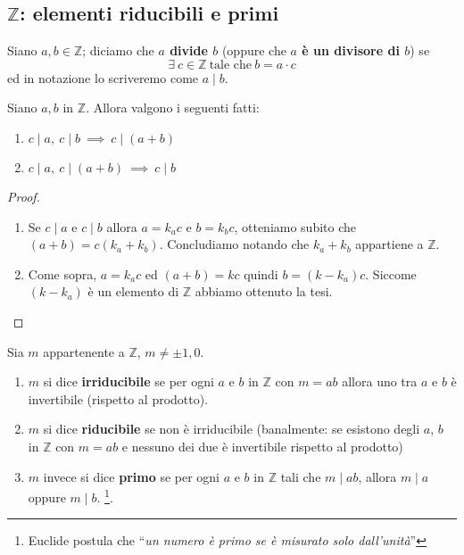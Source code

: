 \subsection{$\mathbb{Z}$: elementi riducibili e primi}
\begin{definizione}[Divisore] Siano $a,b \in \mathbb{Z}$; diciamo che \textbf{$a$ divide $b$} (oppure che \textbf{$a$ è un divisore di $b$}) se 
	\begin{equation*}
	\exists \ c \in \mathbb{Z} \ \text{tale che} \ b = a \cdot c
	\end{equation*}
	ed in notazione lo scriveremo come $a \mid  b$.
\end{definizione}
\begin{proposizione}
	Siano $a,b$ in $\mathbb{Z}$. Allora valgono i seguenti fatti:
	\begin{enumerate}
		\item $c\mid a, \ c\mid b \ \implies \ c\mid (a+b)$
		\item $c\mid a, \ c\mid (a+b) \ \implies \ c\mid b$
	\end{enumerate}
\end{proposizione}
\begin{proof}\ 
\begin{enumerate}
	\item Se $c\mid a$ e $c\mid b$ allora $a=k_a c$ e $b = k_b c$, otteniamo subito che $(a+b)=c(k_a+k_b)$. Concludiamo notando che $k_a+k_b$ appartiene a $\mathbb{Z}$.
	\item Come sopra, $a=k_ac$ ed $(a+b)=kc$ quindi $b=(k-k_a)c$. Siccome $(k-k_a)$ è un elemento di $\mathbb{Z}$ abbiamo ottenuto la tesi.
\end{enumerate}
\end{proof}
\begin{definizione}
	Sia $m$ appartenente a $\mathbb{Z}$, $m \neq \pm 1, 0$.
	\begin{enumerate}
		\item $m$ si dice \textbf{irriducibile} se per ogni $a$ e $b$ in $\mathbb{Z}$ con $m=ab$ allora uno tra $a$ e $b$ è invertibile (rispetto al prodotto).
		\item $m$ si dice \textbf{riducibile} se non è irriducibile (banalmente: se esistono degli $a$, $b$ in $\mathbb{Z}$ con $m=ab$ e nessuno dei due è invertibile rispetto al prodotto)
		\item $m$ invece si dice \textbf{primo} se per ogni $a$ e $b$ in $\mathbb{Z}$ tali che $m\mid ab$, allora $m\mid a$ oppure $m\mid b$. \footnote{Euclide postula che \enquote{\textit{un numero è primo se è misurato solo dall'unità}}}.
	\end{enumerate}
\end{definizione}
